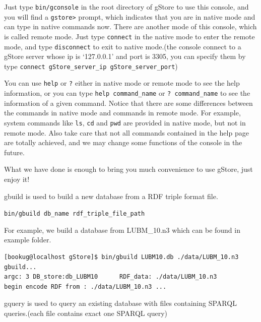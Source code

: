 \documentclass[titlepage, a4paper, 12pt]{article}
\begin{document}
Just type \texttt{bin/gconsole} in the root directory of gStore to use this console, and you will find a \texttt{gstore\textgreater{}} prompt, which indicates that you are in native mode and can type in native commands now. There are another mode of this console, which is called remote mode. Just type \texttt{connect} in the native mode to enter the remote mode, and type \texttt{disconnect} to exit to native mode.(the console connect to a gStore server whose ip is `127.0.0.1' and port is 3305, you can specify them by type \texttt{connect\ gStore\_server\_ip\ gStore\_server\_port})

You can use \texttt{help} or \texttt{?} either in native mode or remote mode to see the help information, or you can type \texttt{help\ command\_name} or \texttt{?\ command\_name} to see the information of a given command. Notice that there are some differences between the commands in native mode and commands in remote mode. For example, system commands like \texttt{ls}, \texttt{cd} and \texttt{pwd} are provided in native mode, but not in remote mode. Also take care that not all commands contained in the help page are totally achieved, and we may change some functions of the console in the future.

What we have done is enough to bring you much convenience to use gStore, just enjoy it!


gbuild is used to build a new database from a RDF triple format file.

\texttt{bin/gbuild\ db\_name\ rdf\_triple\_file\_path}

For example, we build a database from LUBM\_10.n3 which can be found in
example folder.

\begin{verbatim}
[bookug@localhost gStore]$ bin/gbuild LUBM10.db ./data/LUBM_10.n3
gbuild...
argc: 3 DB_store:db_LUBM10      RDF_data: ./data/LUBM_10.n3
begin encode RDF from : ./data/LUBM_10.n3 ...
\end{verbatim}


gquery is used to query an existing database with files containing
SPARQL queries.(each file contains exact one SPARQL query)
\end{document}
